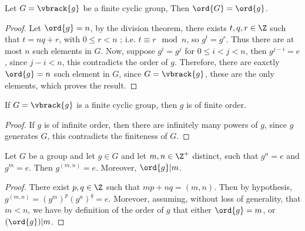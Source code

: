 \begin{lemma}\label{2.3.3}
    Let $G=\vbrack{g}$ be a finite cyclic group, Then $\ord{G}=\ord{g}$.
\end{lemma}
\begin{proof}
    Let $\ord{g}=n$, by the division theorem, there exists $t,q,r \in \Z$ such
    that  $t=nq+r$, with $0 \leq r < n$ ; i.e. $ t \equiv r \mod{n}$, so
    $g^t=g^r$. Thus there are at most  $n$ such elements in  $G$. Now, suppose
    $g^i=g^j$ for  $0 \leq i < j < n$, then  $g^{j-i}=e$, since $j-i < n$, this
    contradicts the order of  $g$. Therefore, there are eaxctly $\ord{g}=n$ such
    element in $G$, since  $G=\vbrack{g}$, these are the only elements, which
    proves the result.
\end{proof}
\begin{corollary}
    If $G=\vbrack{g}$ is a finite cyclic group, then $g$ is of finite order.
\end{corollary}
\begin{proof}
    If $g$ is of infinite order, then there are infinitely many powers of $g$,
    since $g$ generates  $G$, this contradicts the finiteness of  $G$.
\end{proof}

\begin{lemma}\label{2.3.4}
    Let $G$ be a group and let  $g \in G$ and let  $m,n \in \Z^+$ distinct, such
    that  $g^n=e$ and  $g^m=e$. Then  $g^{(m,n)}=e$. Moreover, $\ord{g}|m$.
\end{lemma}
\begin{proof}
    There exist $p,q \in \Z$ such that $mp+nq=(m,n)$. Then by hypothesis,
    $g^{(m,n)}=(g^m)^p(g^n)^q=e$. Morevoer, assuming, without loss of
    generality, that $m<n$, we have by definition of the order of  $g$ that
    either $\ord{g}=m$, or $(\ord{g})|m$.
\end{proof}

